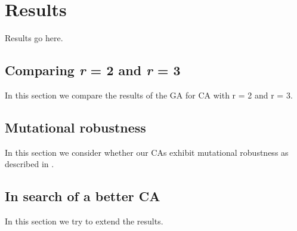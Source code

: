 \section{Results} \label{results}

Results go here.

\subsection{Comparing \textit{r} = 2 and \textit{r} = 3}

In this section we compare the results of the GA for CA with r = 2 and r = 3.

\subsection{Mutational robustness}

In this section we consider whether our CAs exhibit mutational robustness as described in \cite{wagner_role_2012}.

\subsection{In search of a better CA}

In this section we try to extend the results.



